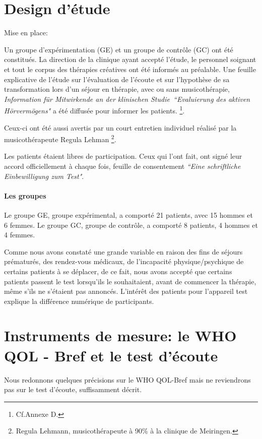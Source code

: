 \section{Design d'étude}

Mise en place:

Un groupe d'expérimentation (GE) et un groupe de contrôle (GC) ont été constitués.
La direction de la clinique ayant accepté l'étude, le personnel soignant et tout le
corpus des thérapies créatives ont  été
informés au préalable.
Une feuille explicative de l'étude sur  l'évaluation de l'écoute et
sur
l'hypothèse de sa transformation lors d'un 
séjour en thérapie, avec ou sans musicothérapie, \emph{Information für Mitwirkende an der klinischen
  Studie\  ``Evaluierung des aktiven Hörvermögens" } a été diffusée
pour informer les patients. \footnote{Cf.Annexe D.}.

Ceux-ci ont été aussi avertis par un
court entretien individuel réalisé par la musicothérapeute Regula Lehman  \footnote{Regula
  Lehmann, musicothérapeute  à 90\%  à la clinique de Meiringen.}.

Les patients étaient libres de participation. Ceux qui
l'ont fait, ont signé leur accord  officiellement à chaque fois,
feuille de consentement  \emph{``Eine schriftliche Einbewilligung zum
  Test"}.

\paragraph{Les groupes}

Le groupe GE, groupe expérimental, a comporté 21 patients, avec 15 hommes et 6
femmes.
Le groupe GC, groupe de contrôle, a comporté 8 patients, 4 hommes et 4 femmes.

Comme nous avons
constaté une grande 
variable en raison des fins de séjours prématurés, des rendez-vous
médicaux, de l'incapacité physique/psychique de certains patients à se
déplacer, de
ce fait,
nous avons accepté que certains patients passent le test lorsqu'ils le
souhaitaient, avant de commencer la thérapie, même s'ils
ne s'étaient pas annoncés. L'intérêt des patients pour l'appareil
test explique la différence numérique de participants.

 
 
 

\section{Instruments de mesure: le WHO QOL - Bref et le test d'écoute}
 Nous redonnons quelques précisions sur le WHO QOL-Bref mais ne
 reviendrons pas sur le test d'écoute, suffisamment décrit.

